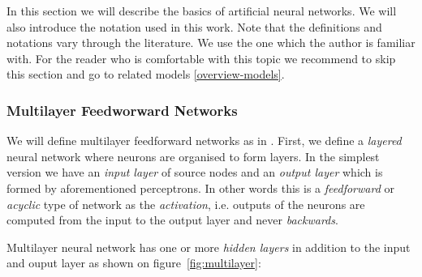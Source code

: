 
\newcommand{\argmin}{\operatornamewithlimits{arg\,min}}
\newcommand{\Bx}{{\bf x}}
\newcommand{\By}{{\bf y}}
\newcommand{\Bh}{{\bf h}}
\newcommand{\Bw}{{\bf w}}
\newcommand{\Bc}{{\bf c}}

In this section we will describe the basics of artificial neural networks. We will also introduce the notation used in this work. Note that the definitions and notations vary through the literature. We use the one which the author is familiar with. For the reader who is comfortable with this topic we recommend to skip this section and go to related models \ref{overview-models}. 

 
\label{sec:perceptron} 

\subsubsection{Multilayer Feedworward Networks} 

We will define multilayer feedforward networks as in \citet{haykin1994neural}. First, we define a \emph{layered} neural network where neurons are organised to form layers. In the simplest version we have an \emph{input layer} of source nodes and an \emph{output layer} which is formed by aforementioned perceptrons. In other words this is a \emph{feedforward} or \emph{acyclic} type of network as the \emph{activation}, i.e. outputs of the neurons are computed from the input to the output layer and never \emph{backwards}. 

Multilayer neural network has one or more \emph{hidden layers} in addition to the input and ouput layer as shown on figure~\ref{fig:multilayer}: 

